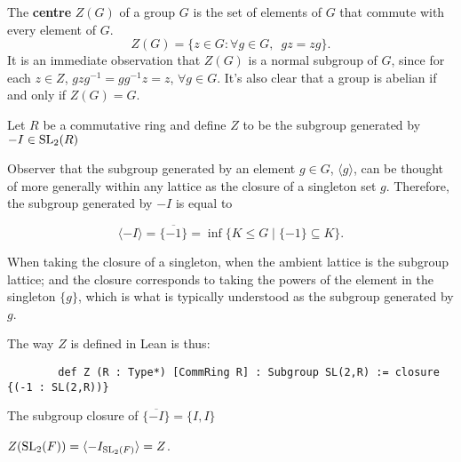 \begin{definition}
\leanok
The \textbf{centre} $Z(G)$ of a group $G$ is the set of elements of  $G$ that commute with every element of $G$.
\begin {equation*} Z(G) = \{ z \in G : \forall g \in G, \hspace{6pt} gz=zg \}. \end{equation*}
It is an immediate observation that $Z(G)$ is a normal subgroup of $G$, 
since for each $z \in Z$, $gzg^{-1} = gg^{-1}z = z$, $\forall g \in G$. It's also clear that a group is abelian if and only if $Z(G)=G$.
\end{definition}



\begin{definition}
\label{SpecialSubgroups.Z}
\leanok
    Let $R$ be a commutative ring and define $Z$ to be the subgroup generated by $- I \in \operatorname{SL}_2(R)$
\end{definition}

\begin{remark}
    Observer that the subgroup generated by an element $g \in G$, $\langle g \rangle$, can be thought of more generally within any lattice as the closure of a singleton set ${g}$. Therefore, the subgroup generated by $-I$ is equal to
    
    \[\langle -I \rangle = \overline{\{-1\}} = \inf \{ K \le G \; | \; \{-1\} \subseteq K \}.\]

    When taking the closure of a singleton, when the ambient lattice is the subgroup lattice; and the closure corresponds to taking the powers of the element in the singleton $\{g\}$,
    which is what is typically understood as the subgroup generated by $g$.

    The way $Z$ is defined in Lean is thus:
    \begin{verbatim}
        def Z (R : Type*) [CommRing R] : Subgroup SL(2,R) := closure {(-1 : SL(2,R))}
    \end{verbatim}
\end{remark}

\begin{lemma}
\label{SpecialSubgroups.closure_neg_one_eq}
\leanok
The subgroup closure of $\overline{\{-I\}} = \{I, I\}$
\end{lemma}

\begin{lemma}
\label{SpecialSubgroups.center_SL2_eq_Z}
\leanok
$Z(\operatorname{SL}_2(F)) = \langle - I_{\operatorname{SL}_2(F)}\rangle = Z$.
\end{lemma}

